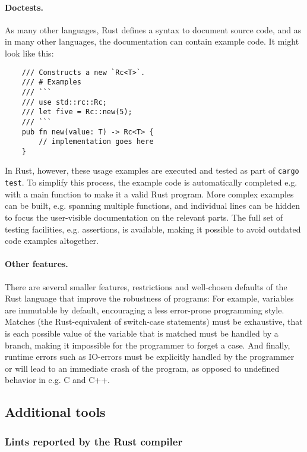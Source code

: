 \documentclass{scrartcl}
\begin{document}
\paragraph{Doctests.} As many other languages, Rust defines a syntax to document source code, and as in many other languages, the documentation can contain example code. It might look like this:

\small {
    \begin{verbatim}
    /// Constructs a new `Rc<T>`.
    /// # Examples
    /// ```
    /// use std::rc::Rc;
    /// let five = Rc::new(5);
    /// ```
    pub fn new(value: T) -> Rc<T> {
        // implementation goes here
    }
    \end{verbatim}
}

In Rust, however, these usage examples are executed and tested as part of \texttt{cargo test}. To simplify this process, the example code is automatically completed e.g. with a main function to make it a valid Rust program. More complex examples can be built, e.g. spanning multiple functions, and individual lines can be hidden to focus the user-visible documentation on the relevant parts. The full set of testing facilities, e.g. assertions, is available, making it possible to avoid outdated code examples altogether.

\paragraph{Other features.} There are several smaller features, restrictions and well-chosen defaults of the Rust language that improve the robustness of programs: For example, variables are immutable by default, encouraging a less error-prone programming style. Matches (the Rust-equivalent of switch-case statements) must be exhaustive, that is each possible value of the variable that is matched must be handled by a branch, making it impossible for the programmer to forget a case. And finally, runtime errors such as IO-errors must be explicitly handled by the programmer or will lead to an immediate crash of the program, as opposed to undefined behavior in e.g. C and C++.





\subsection{Additional tools}


\subsubsection{Lints reported by the Rust compiler}
\end{document}

